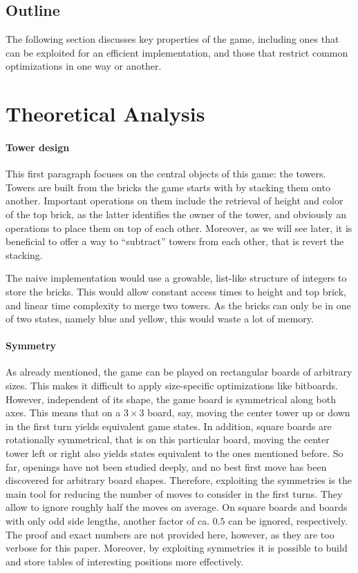 \documentclass[sigconf]{acmart}
\begin{document}
\subsection{Outline}
The following section discusses key properties of the game, including ones that can be exploited for an efficient implementation, and those that restrict common optimizations in one way or another.

\section{Theoretical Analysis}
\paragraph{Tower design}
This first paragraph focuses on the central objects of this game: the towers.
Towers are built from the bricks the game starts with by stacking them onto another.
Important operations on them include the retrieval of height and color of the top brick, as the latter identifies the owner of the tower, and obviously an operations to place them on top of each other.
Moreover, as we will see later, it is beneficial to offer a way to \enquote{subtract} towers from each other, that is revert the stacking.

The naive implementation would use a growable, list-like structure of integers to store the bricks.
This would allow constant access times to height and top brick, and linear time complexity to merge two towers.
As the bricks can only be in one of two states, namely blue and yellow, this would waste a lot of memory.

\paragraph{Symmetry}
As already mentioned, the game can be played on rectangular boards of arbitrary sizes.
This makes it difficult to apply size-specific optimizations like bitboards.
However, independent of its shape, the game board is symmetrical along both axes.
This means that on a $3\times3$ board, say, moving the center tower up or down in the first turn yields equivalent game states.
In addition, square boards are rotationally symmetrical, that is on this particular board, moving the center tower left or right also yields states equivalent to the ones mentioned before.
So far, openings have not been studied deeply, and no best first move has been discovered for arbitrary board shapes.
Therefore, exploiting the symmetries is the main tool for reducing the number of moves to consider in the first turns.
They allow to ignore roughly half the moves on average.
On square boards and boards with only odd side lengths, another factor of ca. $0.5$ can be ignored, respectively.
The proof and exact numbers are not provided here, however, as they are too verbose for this paper.
Moreover, by exploiting symmetries it is possible to build and store tables of interesting positions more effectively.
\end{document}
